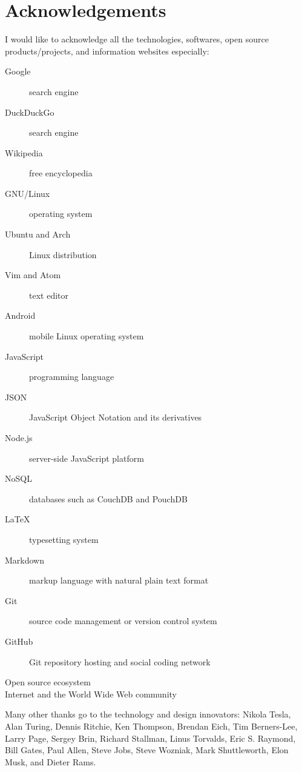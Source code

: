 
\begingroup
\let\clearpage\relax
\let\cleardoublepage\relax

\chapter{Acknowledgements}
\label{chap:acknowledgements}

I would like to acknowledge all the technologies, softwares, open source products/projects, and information websites especially:

\begin{description}
  \item[Google] search engine
  \item[DuckDuckGo] search engine
  \item[Wikipedia] free encyclopedia
  \item[GNU/Linux] operating system
  \item[Ubuntu and Arch] Linux distribution
  \item[Vim and Atom] text editor
  \item[Android] mobile Linux operating system
  \item[JavaScript] programming language
  \item[JSON] JavaScript Object Notation and its derivatives
  \item[Node.js] server-side JavaScript platform
  \item[NoSQL] databases such as CouchDB and PouchDB
  \item[LaTeX] typesetting system
  \item[Markdown] markup language with natural plain text format
  \item[Git] source code management or version control system
  \item[GitHub] Git repository hosting and social coding network
  \item[Open source ecosystem]
  \item[Internet and the World Wide Web community]
\end{description}

\noindent Many other thanks go to the technology and design innovators: Nikola Tesla, Alan Turing, Dennis Ritchie, Ken Thompson, Brendan Eich, Tim Berners-Lee, Larry Page, Sergey Brin, Richard Stallman, Linus Torvalds, Eric S. Raymond, Bill Gates, Paul Allen, Steve Jobs, Steve Wozniak, Mark Shuttleworth, Elon Musk, and Dieter Rams.

\endgroup
